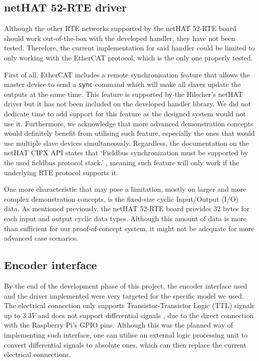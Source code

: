 \subsection{netHAT 52-RTE driver}
Although the other RTE networks supported by the netHAT 52-RTE board should work out-of-the-box with the developed handler, they have not been tested.
Therefore, the current implementation for said handler could be limited to only working with the EtherCAT protocol, which is the only one properly tested.

First of all, EtherCAT includes a remote synchronisation feature that allows the master device to send a \verb|sync| command which will make all slaves update the outputs at the same time.
This feature is supported by the Hilscher's netHAT driver but it has not been included on the developed handler library.
We did not dedicate time to add support for this feature as the designed system would not use it.
Furthermore, we acknowledge that more advanced demonstration concepts would definitely benefit from utilising such feature, especially the ones that would use multiple slave devices simultaneously.
Regardless, the documentation on the netHAT CIFX API states that `Fieldbus synchronization must be supported by the used fieldbus protocol stack.' \cite{nethat:cifx_api_docs}, meaning such feature will only work if the underlying RTE protocol supports it.

One more characteristic that may pose a limitation, mostly on larger and more complex demonstration concepts, is the fixed-size cyclic Input/Output (I/O) data.
As mentioned previously, the netHAT 52-RTE board provides 32 bytes for each input and output cyclic data types.
Although this amount of data is more than sufficient for our proof-of-concept system, it might not be adequate for more advanced case scenarios.

\subsection{Encoder interface}
By the end of the development phase of this project, the encoder interface used and the driver implemented were very targeted for the specific model we used.
The electrical connection only supports Transistor-Transistor Logic (TTL) signals up to $3.3V$ and does not support differential signals \cite{technology:diff-signals}, due to the direct connection with the Raspberry Pi's GPIO pins.
Although this was the planned way of implementing such interface, one can utilise an external logic processing unit to convert differential signals to absolute ones, which can then replace the current electrical connections.

